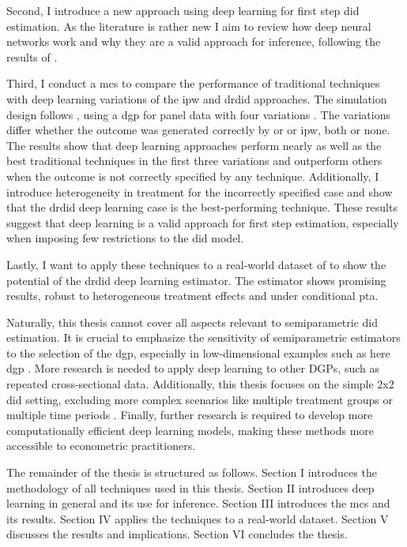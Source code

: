 Second, I introduce a new approach using deep learning for first step \ac{did} estimation.
As the literature is rather new I aim to review how deep neural networks work and why they are a valid approach for inference, following the results of \citet{farrellDeepNeuralNetworks2021}.

Third, I conduct a \ac{mcs} to compare the performance of traditional techniques with deep learning variations of the \ac{ipw} and \ac{drdid} approaches.
The simulation design follows \citet{santannaDoublyRobustDifferenceindifferences2020}, using a \ac{dgp} for panel data with four variations .
The variations differ whether the outcome was generated correctly by \ac{or} or \ac{ipw}, both or none.
The results show that deep learning approaches perform nearly as well as the best traditional techniques in the first three variations and outperform others when the outcome is not correctly specified by any technique.
Additionally, I introduce heterogeneity in treatment for the incorrectly specified case and show that the \ac{drdid} deep learning case is the best-performing technique.
These results suggest that deep learning is a valid approach for first step estimation, especially when imposing few restrictions to the \ac{did} model.

Lastly, I want to apply these techniques to a real-world dataset of \citet{meyer1990workers} to show the potential of the \ac{drdid} deep learning estimator. %
The estimator shows promising results, robust to heterogeneous treatment effects and under conditional \ac{pta}.

Naturally, this thesis cannot cover all aspects relevant to semiparametric \ac{did} estimation.
It is crucial to emphasize the sensitivity of semiparametric estimators to the selection of the \ac{dgp}, especially in low-dimensional examples such as here \ac{dgp} \citep{zimmert2018efficient}.
More research is needed to apply deep learning to other DGPs, such as repeated cross-sectional data.
Additionally, this thesis focuses on the simple 2x2 \ac{did} setting, excluding more complex scenarios like multiple treatment groups or multiple time periods \citep[see][]{callawayDifferenceinDifferencesMultipleTime2021,goodman-baconDifferenceindifferencesVariationTreatment2021}.
Finally, further research is required to develop more computationally efficient deep learning models, making these methods more accessible to econometric practitioners.

The remainder of the thesis is structured as follows. Section I introduces the methodology of all techniques used in this thesis.
Section II introduces deep learning in general and its use for inference.
Section III introduces the \ac{mcs} and its results.
Section IV applies the techniques to a real-world dataset.
Section V discusses the results and implications.
Section VI concludes the thesis.

